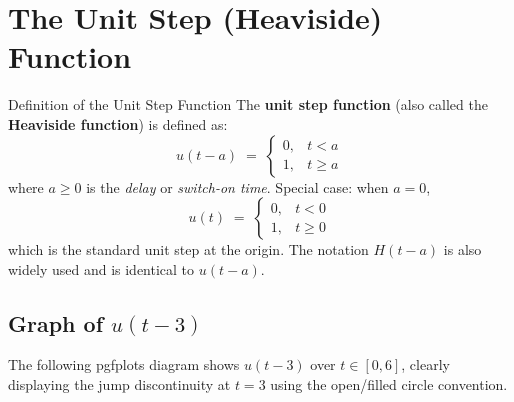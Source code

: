 \documentclass[12pt,a4paper]{article}
\begin{document}
\section{The Unit Step (Heaviside) Function}

\begin{infobox}{Definition of the Unit Step Function}
The \textbf{unit step function} (also called the \textbf{Heaviside function}) is defined as:
\[
  u(t - a) \;=\; \begin{cases} 0, & t < a \\ 1, & t \geq a \end{cases}
\]
where $a \geq 0$ is the \emph{delay} or \emph{switch-on time}.
Special case: when $a = 0$,
\[
  u(t) \;=\; \begin{cases} 0, & t < 0 \\ 1, & t \geq 0 \end{cases}
\]
which is the standard unit step at the origin.
The notation $H(t-a)$ is also widely used and is identical to $u(t-a)$.
\end{infobox}

\subsection*{Graph of $u(t-3)$}

The following pgfplots diagram shows $u(t-3)$ over $t \in [0, 6]$, clearly displaying
the jump discontinuity at $t = 3$ using the open/filled circle convention.

\begin{center}
\end{center}
\end{document}
